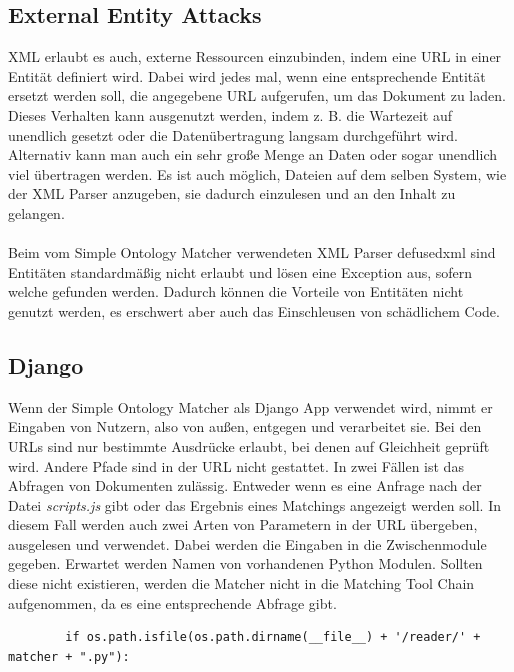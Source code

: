 		\subsection{External Entity Attacks}
		XML erlaubt es auch, externe Ressourcen einzubinden, indem eine URL in einer
		Entität definiert wird. Dabei wird jedes mal, wenn eine entsprechende Entität
		ersetzt werden soll, die angegebene URL aufgerufen, um das Dokument zu laden.
		Dieses Verhalten kann ausgenutzt werden, indem z. B. die Wartezeit auf
		unendlich gesetzt oder die Datenübertragung langsam durchgeführt wird.
		Alternativ kann man auch ein sehr große Menge an Daten oder sogar unendlich
		viel übertragen werden.\cite{Sul09}
		Es ist auch möglich, Dateien auf dem selben System, wie der XML Parser
		anzugeben, sie dadurch einzulesen und an den Inhalt zu gelangen.\cite{defusedxml}
		\\
		\\
		Beim vom Simple Ontology Matcher verwendeten XML Parser defusedxml sind
		Entitäten standardmäßig nicht erlaubt und lösen eine
		Exception aus, sofern welche gefunden werden.\cite{defusedxml}
		Dadurch können die Vorteile von Entitäten nicht genutzt werden, es erschwert
		aber auch das Einschleusen von schädlichem Code.
		
		\subsection{Django}
		Wenn der Simple Ontology Matcher als Django App verwendet wird, nimmt er
		Eingaben von Nutzern, also von außen, entgegen und verarbeitet sie. Bei den
		URLs sind nur bestimmte Ausdrücke erlaubt, bei denen auf Gleichheit geprüft
		wird. Andere Pfade sind in der URL nicht gestattet. In zwei Fällen ist das
		Abfragen von Dokumenten zulässig.
		Entweder wenn es eine Anfrage nach der Datei \textit{scripts.js} gibt oder das Ergebnis
		eines Matchings angezeigt werden soll. In diesem Fall werden auch zwei Arten
		von Parametern in der URL übergeben, ausgelesen und verwendet. Dabei werden
		die Eingaben in die Zwischenmodule gegeben. Erwartet werden Namen von
		vorhandenen Python Modulen. Sollten diese nicht existieren, werden die
		Matcher nicht in die Matching Tool Chain aufgenommen, da es eine
		entsprechende Abfrage gibt.
		\begin{lstlisting}
		if os.path.isfile(os.path.dirname(__file__) + '/reader/' + matcher + ".py"):
		\end{lstlisting}
		
